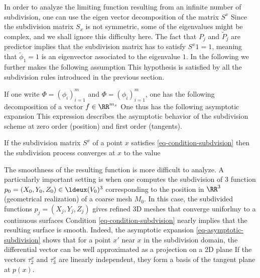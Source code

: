 In order to analyze the limiting function resulting from an infinite number of subdivision, one can use the eigen vector decomposition of the matrix $S^x$
Since the subdivision matrix $S_x$ is not symmetric, some of the eigenvalues might be complex, and we shall ignore this difficulty here. The fact that $P_j$ and $\tilde P_j$ are predictor implies that the subdivision matrix has to satisfy $S^x 1 = 1$, meaning that $\tilde \phi_1 = 1$ is an eigenvector associated to the eigenvalue $1$. In the following we further makes the following assumption
This hypothesis is satisfied by all the subdivision rules introduced in the previous section.

If one write $\Phi = (\phi_i)_{i=1}^m$ and $\Phi = (\phi_i)_{i=1}^m$, one has the following decomposition of a vector $f \in \RR^{m_x}$
One thus has the following asymptotic expansion
This expression describes the asymptotic behavior of the subdivision scheme at zero order (position) and first order (tangents).

\begin{thm}
	If the subdivision matrix $S^x$ of a point $x$ satisfies \eqref{eq-condition-subdvision} then the subdivision process converges at $x$ to the value 
\end{thm}

The smoothness of the resulting function is more difficult to analyze. A particularly important setting is when one computes the subdivision of 3 function $p_0 = (X_0,Y_0,Z_0) \in \ldeux(V_0)^3$ corresponding to the position in $\RR^3$ (geometrical realization) of a coarse mesh $M_0$. In this case, the subdivided functions $p_j = (X_j,Y_j,Z_j)$ gives refined 3D meshes that converge uniforlmy to a continuous surfaces 
Condition \eqref{eq-condition-subdvision} nearly implies that the resulting surface is smooth. Indeed, the asymptotic expansion \eqref{eq-asymptotic-subdivision} shows that for a point $x'$ near $x$ in the subdivision domain, the differential vector can be well approximated as a projection on a 2D plane
If the vectors $\tau_2^x$ and $\tau_3^x$ are linearly independent, they form a basis of the tangent plane at $p(x)$.


